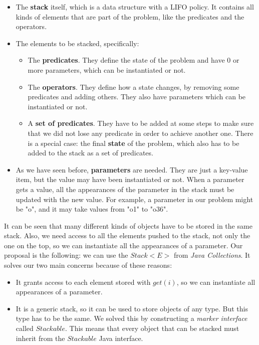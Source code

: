 \documentclass[12pt,a4paper,oneside]{article}
\numberwithin{equation}{section}
\numberwithin{equation}{section}
\theoremstyle{definition}
\begin{document}
\begin{itemize}
	\item The \textbf{stack} itself, which is a data structure with a LIFO policy. It contains all kinds of elements that are part of the problem, like the predicates and the operators.
	\item The elements to be stacked, specifically:
	\begin{itemize}
		\item The \textbf{predicates}. They define the state of the problem and have 0 or more parameters, which can be instantiated or not.
		\item The \textbf{operators}. They define how a state changes, by removing some predicates and adding others. They also have parameters which can be instantiated or not.
		\item A \textbf{set of predicates}. They have to be added at some steps to make sure that we did not lose any predicate in order to achieve another one. There is a special case: the final \textbf{state} of the problem, which also has to be added to the stack as a set of predicates.
	\end{itemize}
	\item As we have seen before, \textbf{parameters} are needed. They are just a key-value item, but the value may have been instantiated or not. When a parameter gets a value, all the appearances of the parameter in the stack must be updated with the new value. For example, a parameter in our problem might be "o", and it may take values from "o1" to "o36".
\end{itemize}

It can be seen that many different kinds of objects have to be stored in the same stack. Also, we need access to all the elements pushed to the stack, not only the one on the top, so we can instantiate all the appearances of a parameter. Our proposal is the following: we can use the $Stack<E>$ from \textit{Java Collections}. It solves our two main concerns because of these reasons:

\begin{itemize}
	\item It grants access to each element stored with $get(i)$, so we can instantiate all appearances of a parameter.
	\item It is a generic stack, so it can be used to store objects of any type. But this type has to be the same. We solved this by constructing a \textit{marker interface} called $Stackable$. This means that every object that can be stacked must inherit from the $Stackable$ Java interface.
\end{itemize}
\end{document}
